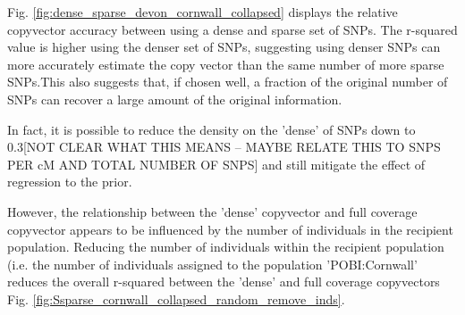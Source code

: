 Fig. \ref{fig:dense_sparse_devon_cornwall_collapsed} displays the relative copyvector accuracy between using a dense and sparse set of SNPs. The r-squared value is higher using the denser set of SNPs, suggesting using denser SNPs can more accurately estimate the copy vector than the same number of more sparse SNPs.This also suggests that, if chosen well, a fraction of the original number of SNPs can recover a large amount of the original information. 

In fact, it is possible to reduce the density on the 'dense' of SNPs down to {\color{red}0.3[NOT CLEAR WHAT THIS MEANS -- MAYBE RELATE THIS TO SNPS PER cM AND TOTAL NUMBER OF SNPS]} and still mitigate the effect of regression to the prior.

However, the relationship between the 'dense' copyvector and full coverage copyvector appears to be influenced by the number of individuals in the recipient population. Reducing the number of individuals within the recipient population (i.e. the number of individuals assigned to the population 'POBI:Cornwall' reduces the overall r-squared between the 'dense' and full coverage copyvectors Fig. \ref{fig:Ssparse_cornwall_collapsed_random_remove_inds}.

